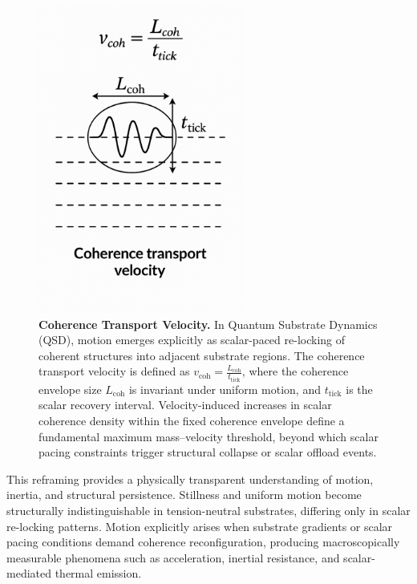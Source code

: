 \documentclass[preprints,article,submit,pdftex,moreauthors]{Definitions/mdpi}
\begin{document}
\begin{figure}[H]
    \centering
    \includegraphics[width=0.6\textwidth]{figures/CTV.pdf}
    \caption{
    \textbf{Coherence Transport Velocity.} 
    In Quantum Substrate Dynamics (QSD), motion emerges explicitly as scalar-paced re-locking of coherent structures into adjacent substrate regions. The coherence transport velocity is defined as \( v_{\text{coh}} = \frac{L_{\text{coh}}}{t_{\text{tick}}} \), where the coherence envelope size \( L_{\text{coh}} \) is invariant under uniform motion, and \( t_{\text{tick}} \) is the scalar recovery interval. Velocity-induced increases in scalar coherence density within the fixed coherence envelope define a fundamental maximum mass--velocity threshold, beyond which scalar pacing constraints trigger structural collapse or scalar offload events.
    }
    \label{fig:coherence-transport-velocity}
\end{figure}

This reframing provides a physically transparent understanding of motion, inertia, and structural persistence. Stillness and uniform motion become structurally indistinguishable in tension-neutral substrates, differing only in scalar re-locking patterns. Motion explicitly arises when substrate gradients or scalar pacing conditions demand coherence reconfiguration, producing macroscopically measurable phenomena such as acceleration, inertial resistance, and scalar-mediated thermal emission.
\end{document}
